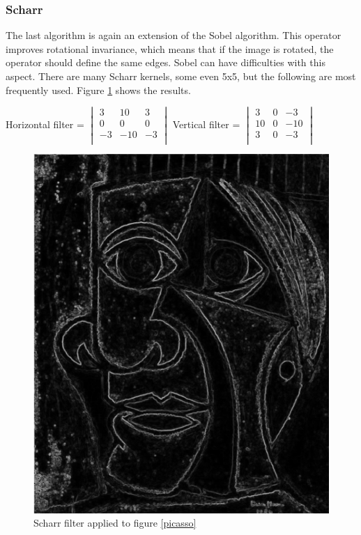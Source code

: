 \documentclass[12pt]{article}
\begin{document}
\subsubsection{Scharr}
The last algorithm is again an extension of the Sobel algorithm. This operator improves rotational invariance, which means that if the image is rotated, the operator should define the same edges. Sobel can have difficulties with this aspect. There are many Scharr kernels, some even 5x5, but the following are most frequently used. Figure \ref{scharr} shows the results.
\newline

Horizontal filter = $\begin{vmatrix}
        3 & 10 & 3\\
        0 & 0 & 0\\
        -3 & -10 & -3\\
\end{vmatrix}$\hspace{11mm}
Vertical filter = $\begin{vmatrix}
        3 & 0 & -3\\
        10 & 0 & -10\\
        3 & 0 & -3\\
\end{vmatrix}$\hspace{5mm}

\begin{figure}[h]
\centering
\includegraphics[scale = 0.39]{img/picassoScharr}
\caption{Scharr filter applied to figure \ref{picasso}}
\label{scharr}
\end{figure}
\newpage
\end{document}
